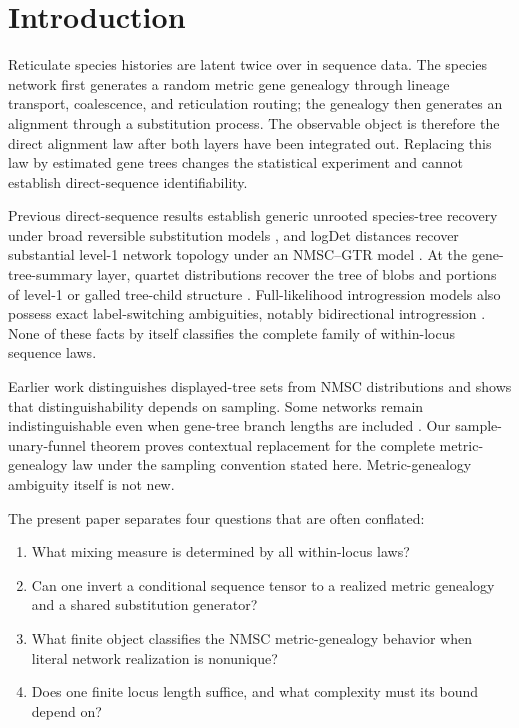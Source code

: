 \documentclass[11pt]{article}
\begin{document}
\section{Introduction}

Reticulate species histories are latent twice over in sequence data.  The species network first generates a random metric gene genealogy through lineage transport, coalescence, and reticulation routing; the genealogy then generates an alignment through a substitution process.  The observable object is therefore the direct alignment law after both layers have been integrated out.  Replacing this law by estimated gene trees changes the statistical experiment and cannot establish direct-sequence identifiability.

Previous direct-sequence results establish generic unrooted species-tree recovery under broad reversible substitution models \citep{ChifmanKubatko2015,AllmanLongRhodes2019}, and logDet distances recover substantial level-1 network topology under an NMSC--GTR model \citep{AllmanBanosRhodes2022}.  At the gene-tree-summary layer, quartet distributions recover the tree of blobs and portions of level-1 or galled tree-child structure \citep{AllmanBanosMitchellRhodes2023,AllmanBanosGarroteRhodes2024,AllmanAneBanosRhodes2025}.  Full-likelihood introgression models also possess exact label-switching ambiguities, notably bidirectional introgression \citep{YangFlouri2022}.  None of these facts by itself classifies the complete family of within-locus sequence laws.

Earlier work distinguishes displayed-tree sets from NMSC distributions and shows that distinguishability depends on sampling.  Some networks remain indistinguishable even when gene-tree branch lengths are included \citep{ZhuDegnan2017}.  Our sample-unary-funnel theorem proves contextual replacement for the complete metric-genealogy law under the sampling convention stated here.  Metric-genealogy ambiguity itself is not new.

The present paper separates four questions that are often conflated:
\begin{enumerate}
\item What mixing measure is determined by all within-locus laws?
\item Can one invert a conditional sequence tensor to a realized metric genealogy and a shared substitution generator?
\item What finite object classifies the NMSC metric-genealogy behavior when literal network realization is nonunique?
\item Does one finite locus length suffice, and what complexity must its bound depend on?
\end{enumerate}
\end{document}
